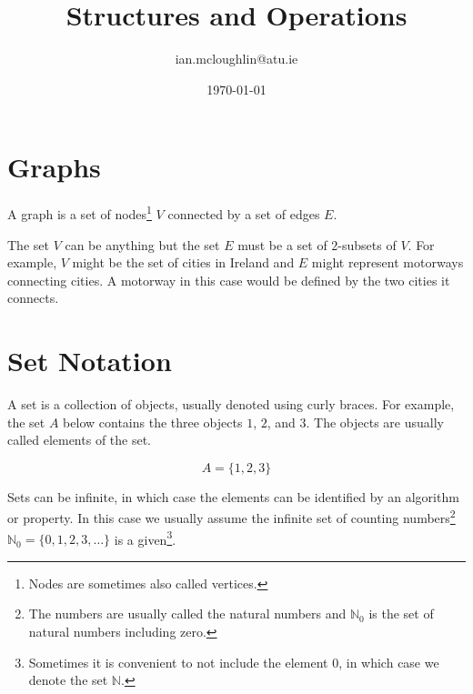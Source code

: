 \documentclass{iansnotes}
\title{Structures and Operations}
\author{ian.mcloughlin@atu.ie}
\date{\today}
\begin{document}
\maketitle


\section{Graphs}
  
  A graph\autocite[10]{sipser} is a set of nodes\footnote{Nodes are sometimes also called vertices.} $V$ connected by a set of edges $E$.

  \begin{figure}
    \center
    \end{figure}

  The set $V$ can be anything but the set $E$ must be a set of $2$-subsets of $V$.
  For example, $V$ might be the set of cities in Ireland and $E$ might represent motorways connecting cities.
  A motorway in this case would be defined by the two cities it connects.

\section{Set Notation}
  A set is a collection of objects, usually denoted using curly braces\autocite[3]{sipser}.
  For example, the set $A$ below contains the three objects $1$, $2$, and $3$.
  The objects are usually called elements of the set.

  $$ A = \{ 1, 2, 3 \} $$

  Sets can be infinite, in which case the elements can be identified by an algorithm or property.
  In this case we usually assume the infinite set of counting numbers\footnote{The numbers are usually called the natural numbers and $\mathbb{N}_0$ is the set of natural numbers including zero.} $\mathbb{N}_0 = \{ 0, 1, 2, 3, \ldots \}$ is a given\footnote{Sometimes it is convenient to not include the element $0$, in which case we denote the set $\mathbb{N}$.}.
\end{document}
